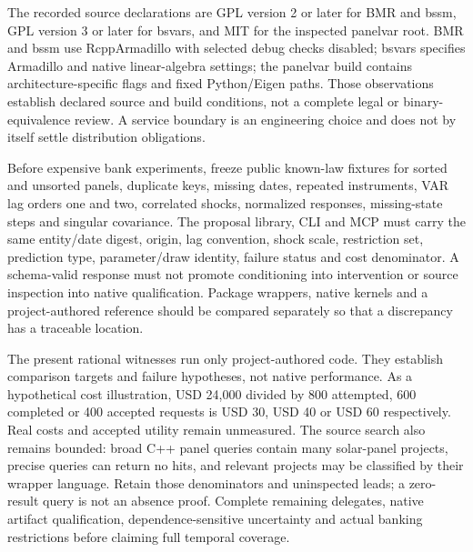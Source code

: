 The recorded source declarations are GPL version 2 or later for BMR and bssm, GPL version 3 or later for bsvars, and MIT for the inspected panelvar root. BMR and bssm use RcppArmadillo with selected debug checks disabled; bsvars specifies Armadillo and native linear-algebra settings; the panelvar build contains architecture-specific flags and fixed Python/Eigen paths. Those observations establish declared source and build conditions, not a complete legal or binary-equivalence review. A service boundary is an engineering choice and does not by itself settle distribution obligations.~\citep{exec25_cdyn_bmr,exec25_cdyn_bsvars,exec25_cdyn_bssm,exec25_cdyn_panelvar}

Before expensive bank experiments, freeze public known-law fixtures for sorted and unsorted panels, duplicate keys, missing dates, repeated instruments, VAR lag orders one and two, correlated shocks, normalized responses, missing-state steps and singular covariance. The proposal library, CLI and MCP must carry the same entity/date digest, origin, lag convention, shock scale, restriction set, prediction type, parameter/draw identity, failure status and cost denominator. A schema-valid response must not promote conditioning into intervention or source inspection into native qualification. Package wrappers, native kernels and a project-authored reference should be compared separately so that a discrepancy has a traceable location.~\citep{exec25_cdyn_choice}

The present rational witnesses run only project-authored code. They establish comparison targets and failure hypotheses, not native performance. As a hypothetical cost illustration, USD 24,000 divided by 800 attempted, 600 completed or 400 accepted requests is USD 30, USD 40 or USD 60 respectively. Real costs and accepted utility remain unmeasured. The source search also remains bounded: broad C++ panel queries contain many solar-panel projects, precise queries can return no hits, and relevant projects may be classified by their wrapper language. Retain those denominators and uninspected leads; a zero-result query is not an absence proof. Complete remaining delegates, native artifact qualification, dependence-sensitive uncertainty and actual banking restrictions before claiming full temporal coverage.~\citep{exec25_cdyn_choice}
